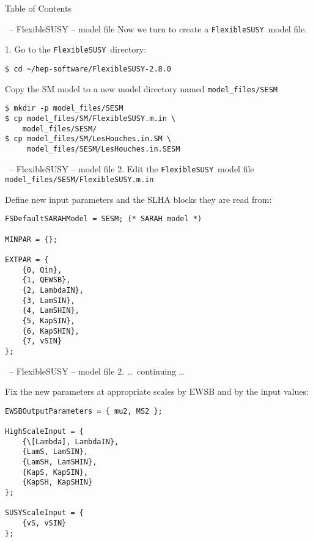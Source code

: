 \documentclass[11pt]{beamer}
\newcommand{\FlexibleSUSY}{\texttt{FlexibleSUSY}}
\begin{document}

\begin{frame}{Table of Contents}
\end{frame}


\begin{frame}[fragile]{\insertsection\ -- FlexibleSUSY -- model file}
  Now we turn to create a \FlexibleSUSY\ model file.

  \bigskip

  1. Go to the \FlexibleSUSY\ directory:
  \begin{lstlisting}
$ cd ~/hep-software/FlexibleSUSY-2.8.0\end{lstlisting}%
  Copy the SM model to a new model directory named \texttt{model\_files/SESM}
  \begin{lstlisting}
$ mkdir -p model_files/SESM
$ cp model_files/SM/FlexibleSUSY.m.in \
    model_files/SESM/
$ cp model_files/SM/LesHouches.in.SM \
     model_files/SESM/LesHouches.in.SESM\end{lstlisting}%
\end{frame}


\begin{frame}[fragile]{\insertsection\ -- FlexibleSUSY -- model file}
  2. Edit the \FlexibleSUSY\ model file
  \texttt{model\_files/SESM/FlexibleSUSY.m.in}

  \bigskip

  Define new input parameters and the SLHA blocks they are read from:
  \begin{lstlisting}
FSDefaultSARAHModel = SESM; (* SARAH model *)

MINPAR = {};

EXTPAR = {
    {0, Qin},
    {1, QEWSB},
    {2, LambdaIN},
    {3, LamSIN},
    {4, LamSHIN},
    {5, KapSIN},
    {6, KapSHIN},
    {7, vSIN}
};\end{lstlisting}%
\end{frame}


\begin{frame}[fragile]{\insertsection\ -- FlexibleSUSY -- model file}
  2. \ldots\ continuing \ldots

  \bigskip

  Fix the new parameters at appropriate scales by EWSB and by the
  input values:
  \begin{lstlisting}
EWSBOutputParameters = { mu2, MS2 };

HighScaleInput = {
    {\[Lambda], LambdaIN},
    {LamS, LamSIN},
    {LamSH, LamSHIN},
    {KapS, KapSIN},
    {KapSH, KapSHIN}
};

SUSYScaleInput = {
    {vS, vSIN}
};\end{lstlisting}%
\end{frame}
\end{document}
